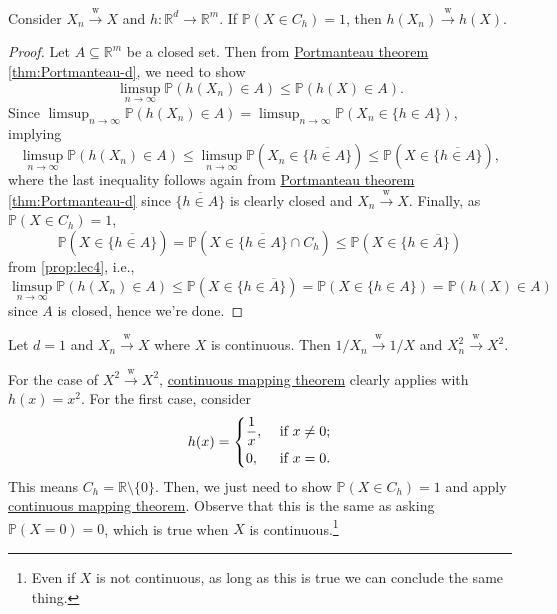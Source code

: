\begin{theorem}\label{thm:continuous-mapping}
	Consider \(X_n \overset{\text{w} }{\to } X\) and \(h \colon \mathbb{R} ^d \to \mathbb{R} ^m\). If \(\mathbb{P} (X \in C_h) = 1\), then \(h(X_n) \overset{\text{w} }{\to } h(X)\).
\end{theorem}
\begin{proof}
	Let \(A \subseteq \mathbb{R} ^m\) be a closed set. Then from \hyperref[thm:Portmanteau]{Portmanteau theorem} \autoref{thm:Portmanteau-d}, we need to show
	\[
		\limsup_{n \to \infty} \mathbb{P} (h(X_n) \in A)
		\leq \mathbb{P} (h(X) \in A).
	\]
	Since \(\limsup_{n \to \infty} \mathbb{P} (h(X_n) \in A) = \limsup_{n \to \infty} \mathbb{P} (X_n \in \{ h \in A \} )\), implying
	\[
		\limsup_{n \to \infty} \mathbb{P} (h(X_n) \in A)
		\leq \limsup_{n \to \infty} \mathbb{P} (X_n \in \overline{\{ h \in A \}} )
		\leq \mathbb{P} (X \in \overline{\{ h \in A \} }),
	\]
	where the last inequality follows again from \hyperref[thm:Portmanteau]{Portmanteau theorem} \autoref{thm:Portmanteau-d} since \(\overline{\{ h \in A \} }\) is clearly closed and \(X_n \overset{\text{w} }{\to } X\). Finally, as \(\mathbb{P} (X \in C_h) = 1\),
	\[
		\mathbb{P} (X \in \overline{\{ h \in A \} })
		= \mathbb{P} (X \in \overline{\{ h \in A \} } \cap C_h)
		\leq \mathbb{P} (X \in \{ h \in \overline{A} \} )
	\]
	from \autoref{prop:lec4}, i.e.,
	\[
		\limsup_{n \to \infty} \mathbb{P} (h(X_n) \in A)
		\leq \mathbb{P} (X \in \{ h \in \overline{A} \} )
		= \mathbb{P} (X \in \{ h \in A \} )
		= \mathbb{P} (h(X) \in A)
	\]
	since \(A\) is closed, hence we're done.
\end{proof}

\begin{eg}
	Let \(d = 1\) and \(X_n \overset{\text{w} }{\to } X\) where \(X\) is continuous. Then \(1 / X_n \overset{\text{w} }{\to } 1 / X\) and \(X_n^2 \overset{\text{w} }{\to } X^2\).
\end{eg}
\begin{explanation}
	For the case of \(X^2 \overset{\text{w} }{\to } X^2\), \hyperref[thm:continuous-mapping]{continuous mapping theorem} clearly applies with \(h(x) = x^2\). For the first case, consider
	\[
		h(x) = \begin{dcases}
			\frac{1}{x}, & \text{ if } x \neq 0 ; \\
			0,           & \text{ if } x = 0 .
		\end{dcases}
	\]
	This means \(C_h = \mathbb{R} \setminus \{ 0 \} \). Then, we just need to show \(\mathbb{P} (X \in C_h) = 1 \) and apply \hyperref[thm:continuous-mapping]{continuous mapping theorem}. Observe that this is the same as asking \(\mathbb{P} (X = 0) = 0\), which is true when \(X\) is continuous.\footnote{Even if \(X\) is not continuous, as long as this is true we can conclude the same thing.}
\end{explanation}

